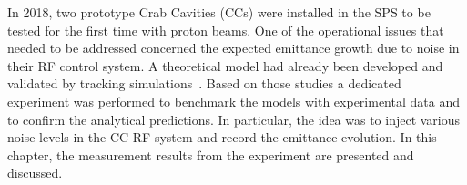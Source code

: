 In 2018, two prototype Crab Cavities (CCs) were installed in the SPS to be tested for the first time
with proton beams. One of the operational issues that needed to be addressed concerned the expected 
emittance growth due to noise in their RF control system. A theoretical model had already been developed
and validated by tracking simulations~\cite{PhysRevSTAB.18.101001}. Based on those studies a dedicated 
experiment was performed to benchmark the models with experimental data and to confirm the analytical
 predictions. In particular, the idea was to inject various noise levels in the CC RF system and record
 the emittance evolution. In this chapter, the measurement results from the experiment are presented 
 and discussed. 